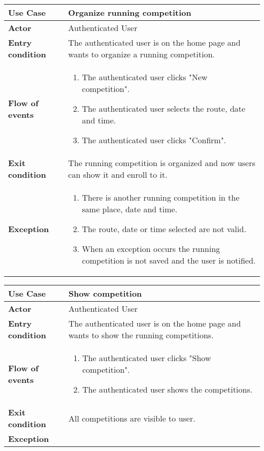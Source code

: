 \documentclass[../main.tex]{subfiles}
\begin{document}
	\begin{center}
		\begin{tabular}{p{3cm}p{8.28cm}}
			\hline
			\textbf{Use Case} & Organize running competition\\
			\hline
			\textbf{Actor} & Authenticated User\\
			\hline
			\textbf{Entry condition} & The authenticated user is on the home page and wants to organize a running competition.\\
			\hline
			\textbf{Flow of events} & \begin{enumerate}
				\linespread{0}\item The authenticated user clicks "New competition".
				\linespread{0}\item The authenticated user selects the route, date and time.
				\linespread{0}\item The authenticated user clicks "Confirm".
			\end{enumerate}\\
			\hline
			\textbf{Exit condition} & The running competition is organized and now users can show it and enroll to it.\\
			\hline
			\textbf{Exception} & \begin{enumerate}
				\linespread{0}\item There is another running competition in the same place, date and time.
				\linespread{0}\item The route, date or time selected are not valid.
				\linespread{0}\item When an exception occurs the running competition is not saved and the user is notified.
			\end{enumerate}\\
			\hline
		\end{tabular}
	\end{center}
	\vspace*{3cm}
	\begin{center}
		\begin{tabular}{p{3cm}p{8.28cm}}
			\hline
			\textbf{Use Case} & Show competition\\
			\hline
			\textbf{Actor} & Authenticated User\\
			\hline
			\textbf{Entry condition} & The authenticated user is on the home page and wants to show the running competitions.\\
			\hline
			\textbf{Flow of events} & \begin{enumerate}
				\linespread{0}\item The authenticated user clicks "Show competition".
				\linespread{0}\item The authenticated user shows the competitions.
			\end{enumerate}\\
			\hline
			\textbf{Exit condition} & All competitions are visible to user.\\
			\hline
			\textbf{Exception}\\
			\hline
		\end{tabular}
	\end{center}
\end{document}
